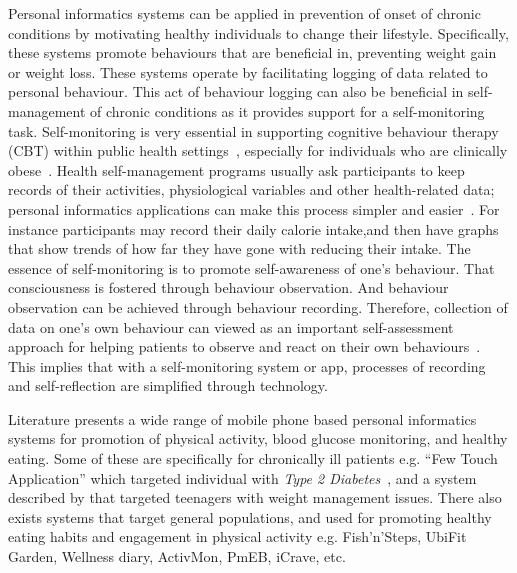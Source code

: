 Personal informatics systems can be applied in prevention of onset of chronic conditions by motivating healthy individuals to change their lifestyle. Specifically, these systems promote behaviours that are beneficial in, preventing weight gain or weight loss. These systems operate by facilitating logging of data related to personal behaviour. This act of behaviour logging can also be beneficial in self-management of chronic conditions as it provides support for a self-monitoring task. Self-monitoring is very essential in supporting cognitive behaviour therapy (CBT) within public health settings~\citep{mattila2008mobile}, especially for individuals who are clinically obese~\citep{nih2000practical}. Health self-management programs usually ask participants to keep records of their activities, physiological variables and other health-related data; personal informatics applications can make this process simpler and easier~\citep{medynskiy2010salud}. For instance participants may record their daily calorie intake,and then have graphs that show trends of how far they have gone with reducing their intake. The essence of self-monitoring is to promote self-awareness of one’s behaviour. That consciousness is fostered through behaviour observation. And behaviour observation can be achieved through behaviour recording. Therefore, collection of data on one's own behaviour can viewed as an important self-assessment approach for helping patients to observe and react on their own behaviours~\citep{rapp2014meaningful}. This implies that with a self-monitoring system or app, processes of recording and self-reflection are simplified through technology. 

Literature presents a wide range of mobile phone based personal informatics systems for promotion of physical activity, blood glucose monitoring, and healthy eating. Some of these are specifically for chronically ill patients e.g. ``Few Touch Application'' which targeted individual with  \emph{Type 2 Diabetes}~\citep{arsand:mobile}, and a system described by \cite{arteaga2010:persuasive} that targeted teenagers with weight management issues. There also exists systems that target general populations, and used for promoting healthy eating habits and engagement in physical activity e.g. Fish'n'Steps\citep{lin2006:fish}, UbiFit Garden\citep{klasnja2009:using}, Wellness diary\citep{mattila2008mobile}, ActivMon\citep{burns2012using}, PmEB\citep{lee2006pmeb}, iCrave\citep{hsu2014persuasive}, etc. 

